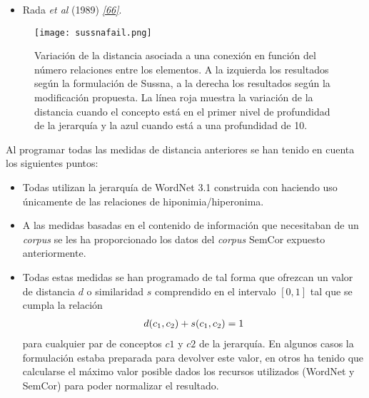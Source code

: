 \documentclass[a4paper,12pt,spanish]{book}
\begin{document}
\begin{itemize}
\item {} 
Rada \emph{et al} (1989) \label{4.model/i.recursos:id14}{\hyperref[zreferences:rada1989]{\emph{{[}66{]}}}}.

\end{itemize}
\begin{figure}[htbp]
\centering
\capstart

\texttt{[image: sussnafail.png]}
\caption[Evolución de la distancia entre conceptos según la formulación de Sussna (y corrección propuesta).]{Variación de la distancia asociada a una conexión en función del número relaciones
entre los elementos. A la izquierda los resultados según la formulación de
Sussna, a la derecha los resultados según la modificación propuesta. La línea roja
muestra la variación de la distancia cuando el concepto está en el primer nivel de
profundidad de la jerarquía y la azul cuando está a una profundidad de 10.}\label{4.model/i.recursos:fig-sussna-fail}\end{figure}

Al programar todas las medidas de distancia anteriores se han tenido en cuenta los siguientes
puntos:
\begin{itemize}
\item {} 
Todas utilizan la jerarquía de WordNet 3.1 construida con  haciendo uso
únicamente de las relaciones de hiponimia/hiperonima.

\item {} 
A las medidas basadas en el contenido de información que necesitaban de un \emph{corpus} se les
ha proporcionado los datos del \emph{corpus} SemCor expuesto anteriormente.

\item {} 
Todas estas medidas se han programado de tal forma que ofrezcan un valor de distancia
\(d\) o similaridad \(s\) comprendido en el intervalo \([0,1]\) tal que
se cumpla la relación
\begin{gather}
\begin{split}d(c_1, c_2) + s(c_1, c_2) = 1\end{split}\notag
\end{gather}
para cualquier par de conceptos \(c1\) y \(c2\) de la jerarquía. En algunos
casos la formulación estaba preparada para devolver este valor, en otros ha tenido
que calcularse el máximo valor posible dados los recursos utilizados (WordNet y SemCor)
para poder normalizar el resultado.

\end{itemize}
\end{document}
